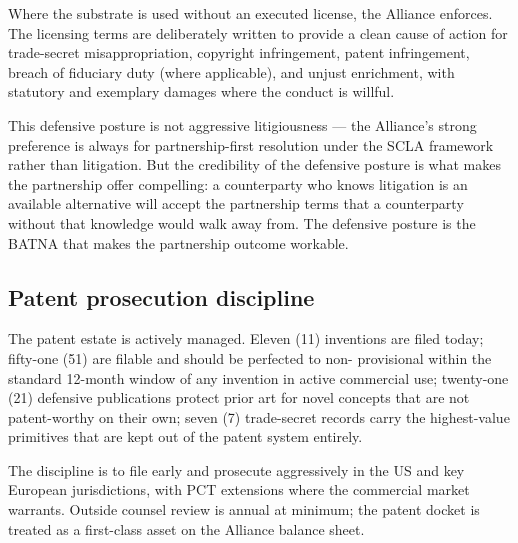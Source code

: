 Where the substrate is used without an executed license, the Alliance
enforces. The licensing terms are deliberately written to provide a
clean cause of action for trade-secret misappropriation, copyright
infringement, patent infringement, breach of fiduciary duty (where
applicable), and unjust enrichment, with statutory and exemplary
damages where the conduct is willful.

This defensive posture is not aggressive litigiousness --- the Alliance's
strong preference is always for partnership-first resolution under the
SCLA framework rather than litigation. But the credibility of the
defensive posture is what makes the partnership offer compelling: a
counterparty who knows litigation is an available alternative will
accept the partnership terms that a counterparty without that knowledge
would walk away from. The defensive posture is the BATNA that makes the
partnership outcome workable.

\subsection{Patent prosecution discipline}

The patent estate is actively managed. Eleven (11) inventions are filed
today; fifty-one (51) are filable and should be perfected to non-
provisional within the standard 12-month window of any invention in
active commercial use; twenty-one (21) defensive publications protect
prior art for novel concepts that are not patent-worthy on their own;
seven (7) trade-secret records carry the highest-value primitives that
are kept out of the patent system entirely.

The discipline is to file early and prosecute aggressively in the US
and key European jurisdictions, with PCT extensions where the
commercial market warrants. Outside counsel review is annual at minimum;
the patent docket is treated as a first-class asset on the Alliance
balance sheet.
